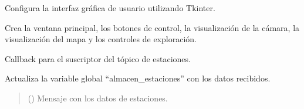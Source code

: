 \documentclass[a4paper,10pt,spanish]{sphinxmanual}
\begin{document}
\begin{fulllineitems}
\begin{fulllineitems}
\end{fulllineitems}


\begin{fulllineitems}
\label{\detokenize{squad_state_manager:squad_interfaz.InterfazManager.setup_gui}}
\pysigstartsignatures
{}
\pysigstopsignatures
\sphinxAtStartPar
Configura la interfaz gráfica de usuario utilizando Tkinter.

\sphinxAtStartPar
Crea la ventana principal, los botones de control, la visualización de la cámara,
la visualización del mapa y los controles de exploración.

\end{fulllineitems}


\begin{fulllineitems}
\label{\detokenize{squad_state_manager:squad_interfaz.InterfazManager.signal_handler}}
\pysigstartsignatures
{}
\pysigstopsignatures
\end{fulllineitems}


\begin{fulllineitems}
\label{\detokenize{squad_state_manager:squad_interfaz.InterfazManager.stations_callback}}
\pysigstartsignatures
{}
\pysigstopsignatures
\sphinxAtStartPar
Callback para el suscriptor del tópico de estaciones.

\sphinxAtStartPar
Actualiza la variable global “almacen\_estaciones” con los datos recibidos.
\begin{quote}\begin{description}
\sphinxAtStartPar
{} () \textendash{} Mensaje con los datos de estaciones.


\end{description}
\end{quote}
\end{fulllineitems}
\end{fulllineitems}
\end{document}
